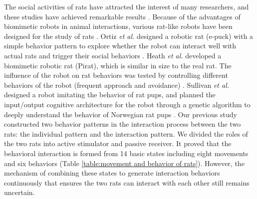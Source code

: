 The social activities of rats have attracted the interest of many researchers,
and these studies have achieved remarkable results
\cite{fleliz_bidirectional_modulation,weiss_shall_two_walk}. Because of the
advantages of biomimetic robots in animal interactions, various rat-like robots
have been designed for the study of rats \cite{Lucas2018DesignOA,Shi_bb_2013,
Shi_bb_2015,shi-gao-tro-2022}. Ortiz \textit{et al.} designed a robotic rat
(e-puck) with a simple behavior pattern to explore whether the robot can
interact well with actual rats and trigger their social behaviors
\cite{Rusalky-sit}. Heath \textit{et al.} developed a biomimetic robotic rat (Pirat),
which is similar in size to the real rat. The influence of the robot on rat
behaviors was tested by controlling different behaviors of the robot (frequent
approach and avoidance) \cite{pirat}. Sullivan \textit{et al.} designed a robot
imitating the behavior of rat pups, and planned the input/output cognitive
architecture for the robot through a genetic algorithm to deeply understand the
behavior of Norwegian rat pups \cite{sullivan-arl-2015}. Our previous study
constructed two behavior patterns in the interaction process between the two
rats: the individual pattern and the interaction pattern. We divided the roles
of the two rats into active stimulator and passive receiver. It proved that the
behavioral interaction is formed from 14 basic states including eight
movements and six behaviors (Table \ref{table:movement and behavior of rats}).
However, the mechanism of combining these states to generate interaction
behaviors continuously that ensures the two rats can interact with each other
still remains uncertain.
